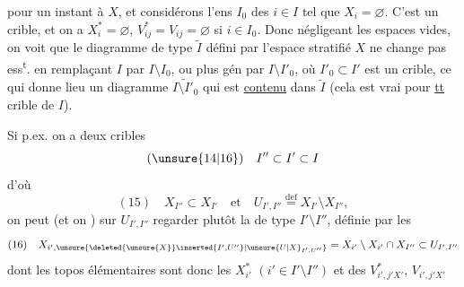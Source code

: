  pour un instant à $X$, et
considérons l'ens  $I_0$ des $i\in I$ tel que
$X_i=\varnothing$. C'est un crible, et on a
$X_i^*=\varnothing$, $V_{ij}^*=V_{ij}=\varnothing$ si $i\in I_0$. Donc négligeant
les espaces vides, on voit que le diagramme
de type $\widetilde I$ défini par l'espace stratifié $X$
ne change pas ess\textsuperscript{t}. en remplaçant $I$ par
$I\setminus I_0$, ou plus gén par $I\setminus I'_0$, où $I'_0\subset I'$
est un crible,
ce qui donne lieu  un diagramme
$\widetilde{I\setminus I'_0}$ qui est \uline{contenu} dans $\widetilde I$ (cela est
vrai pour \uline{tt} crible de $I$).

Si p.ex. on a deux cribles
\[
(\unsure{14|16})\quad I''\subset I'\subset I
\]
d'où
\[
(15)\quad X_{I''}\subset X_{I'}\quad\text{et}\quad U_{I',I''}\overset{\mathrm{def}}{=}X_{I'}\setminus X_{I''},
\]
on peut  (et on ) sur $U_{I',I''}$ regarder
plutôt la   de type $I'\setminus I''$,
définie par les 
\[
(16)\quad X_{i',\unsure{\deleted{\unsure{X}}\inserted{I',U''}|\unsure{U|X}_{I',U''}}}=X_{i'}\setminus X_{i'}\cap X_{I''}\subset U_{I',I''}
\]
dont les topos élémentaires sont donc les
$X_{i'}^*$ $(i'\in I'\setminus I'')$ et des $V^*_{i',j'X'}$, $V_{i',j'X'}$

